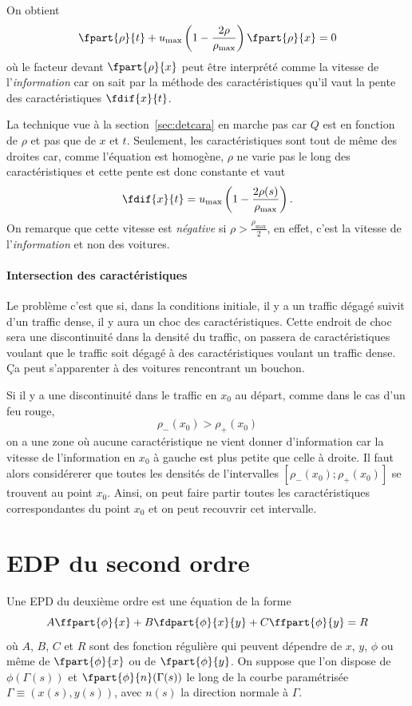 On obtient
\[ \fpart{\rho}{t} + u_\mathrm{max}
\left(1 - \frac{2\rho}{\rho_\mathrm{max}}\right)\fpart{\rho}{x} = 0 \]
où le facteur devant $\fpart{\rho}{x}$ peut être interprété comme la vitesse
de l'\emph{information} car on sait par la méthode des caractéristiques
qu'il vaut la pente des caractéristiques $\fdif{x}{t}$.

La technique vue à la section~\ref{sec:detcara} en marche
pas car $Q$ est en fonction de $\rho$ et pas que de $x$ et $t$.
Seulement, les caractéristiques sont tout de même des droites
car, comme l'équation est homogène,
$\rho$ ne varie pas le long des caractéristiques et cette
pente est donc constante et vaut
\[ \fdif{x}{t} =
u_\mathrm{max} \left(1-\frac{2\rho(s)}{\rho_\mathrm{max}}\right). \]
On remarque que cette vitesse est \emph{négative} si
$\rho > \frac{\rho_\mathrm{max}}{2}$,
en effet, c'est la vitesse de l'\emph{information} et non
des voitures.

\paragraph{Intersection des caractéristiques}
Le problème c'est que si, dans la conditions initiale,
il y a un traffic dégagé suivit d'un traffic dense,
il y aura un choc des caractéristiques.
Cette endroit de choc sera une discontinuité dans la densité du traffic,
on passera de caractéristiques voulant que le traffic soit dégagé à des
caractéristiques voulant un traffic dense.
Ça peut s'apparenter à des voitures rencontrant un bouchon.

Si il y a une discontinuité dans le traffic en $x_0$ au départ,
comme dans le cas d'un feu rouge,
\[ \rho_-(x_0) > \rho_+(x_0) \]
on a une zone où aucune caractéristique ne vient donner d'information
car la vitesse de l'information en $x_0$ à gauche est plus petite
que celle à droite.
Il faut alors considérerer que toutes les densités de l'intervalles
$[\rho_-(x_0); \rho_+(x_0)]$ se trouvent au point $x_0$.
Ainsi, on peut faire partir toutes les caractéristiques correspondantes
du point $x_0$ et on peut recouvrir cet intervalle.

\section{EDP du second ordre}
Une EPD du deuxième ordre est une équation de la forme
\[ A \ffpart{\phi}{x} + B\fdpart{\phi}{x}{y} + C\ffpart{\phi}{y} = R \]
où $A$, $B$, $C$ et $R$ sont des fonction régulière qui peuvent
dépendre de $x$, $y$, $\phi$ ou même de $\fpart{\phi}{x}$ ou de
$\fpart{\phi}{y}$. On suppose que l'on dispose de $\phi(\Gamma(s))$ et
$\fpart{\phi}{n}(\Gamma(s))$ le long de la courbe paramétrisée $\Gamma
\equiv (x(s), y(s))$, avec $n(s)$ la direction normale à $\Gamma$.

